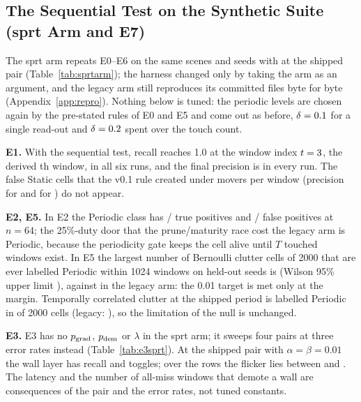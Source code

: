 \subsection{The Sequential Test on the Synthetic Suite (sprt Arm and E7)}\label{subsec:sprtsynth}



The sprt arm repeats E0--E6 on the same scenes and seeds with  at the shipped pair (Table~\ref{tab:sprtarm}); the harness changed only by taking the arm as an argument, and the legacy arm still reproduces its committed files byte for byte (Appendix~\ref{app:repro}). Nothing below is tuned: the periodic levels are chosen again by the pre-stated rules of E0 and E5 and come out as before, $\delta=0.1$ for a single read-out and $\delta=0.2$ spent over the touch count.

\noindent\textbf{E1.} With the sequential test, recall reaches 1.0 at the window index $t=3$, the derived \SqEoneFirstWindow{}th window, in all six runs, and the final precision is \SqEonePrecMin{} in every run. The false Static cells that the v0.1 rule created under \SqMoversHigh{} movers per window (precision \SqEoneLegGrid{} for  and \SqEoneLegVox{} for ) do not appear.

\noindent\textbf{E2, E5.} In E2 the Periodic class has \SqEtwoTp/\SqEtwoPos{} true positives and \SqEtwoFp/\SqEtwoNeg{} false positives at $n=64$; the 25\%-duty door that the prune/maturity race cost the legacy arm is Periodic, because the periodicity gate keeps the cell alive until $T$ touched windows exist. In E5 the largest number of Bernoulli clutter cells of 2000 that are ever labelled Periodic within 1024 windows on held-out seeds is \SqEfiveWorst{} (Wilson 95\% upper limit \SqEfiveWorstHi), against \SqEfiveLegWorst{} in the legacy arm: the 0.01 target is met only at the margin. Temporally correlated clutter at the shipped period is labelled Periodic in \SqEfiveMarkov{} of 2000 cells (legacy: \SqEfiveMarkovLeg{}), so the limitation of the null is unchanged.



\noindent\textbf{E3.} E3 has no $p_{\mathrm{grad}}$, $p_{\mathrm{dem}}$ or $\lambda$ in the sprt arm; it sweeps four pairs at three error rates instead (Table~\ref{tab:e3sprt}). At the shipped pair with $\alpha=\beta=0.01$ the wall layer has recall \SqEthreeRecall{} and \SqEthreeFlicker{} toggles; over the \SqEthreeRows{} rows the flicker lies between \SqEthreeFlickerLo{} and \SqEthreeFlickerHi. The latency and the number of all-miss windows that demote a wall are consequences of the pair and the error rates, not tuned constants.

